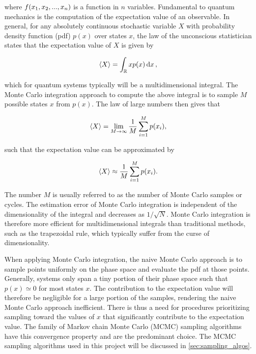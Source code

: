 where $f \qty(x_1, x_2, ..., x_n)$ is a function in $n$ variables. Fundamental to quantum mechanics is the computation of the expectation value of an observable. In general, for any absolutely continuous stochastic variable $X$ with probability density function (pdf) $p(x)$ over states $x$, the law of the unconscious statistician states that the expectation value of $X$ is given by 

\begin{equation}\label{eq:general_expval}
    \expval{X} = \int_{\mathbb{R}} x p (x) \dd{x},
\end{equation}

which for quantum systems typically will be a multidimensional integral. The Monte Carlo integration approach to compute the above integral is to sample $M$ possible states $x$ from $p(x)$. The law of large numbers then gives that 

\begin{equation*}
    \expval{X} = \lim_{M \to \infty} \frac{1}{M} \sum_{i=1}^M p \qty(x_i),
\end{equation*}

such that the expectation value can be approximated by

\begin{equation}\label{eq:mc_integration}
    \expval{X} \approx \frac{1}{M} \sum_{i=1}^M p \qty(x_i).
\end{equation}

The number $M$ is usually referred to as the number of Monte Carlo samples or cycles. The estimation error of Monte Carlo integration is independent of the dimensionality of the integral and decreases as $1 / \sqrt{N}$. Monte Carlo integration is therefore more efficient for multidimensional integrals than traditional methods, such as the trapezoidal rule, which typically suffer from the curse of dimensionality. 

When applying Monte Carlo integration, the naive Monte Carlo approach is to sample points uniformly on the phase space and evaluate the pdf at those points. Generally, systems only span a tiny portion of their phase space such that $p(x) \simeq 0$ for most states $x$. The contribution to the expectation value will therefore be negligible for a large portion of the samples, rendering the naive Monte Carlo approach inefficient. There is thus a need for procedures prioritizing sampling toward the values of $x$ that significantly contribute to the expectation value. The family of Markov chain Monte Carlo (MCMC) sampling algorithms have this convergence property and are the predominant choice. The MCMC sampling algorithms used in this project will be discussed in \autoref{sec:sampling_algos}.


